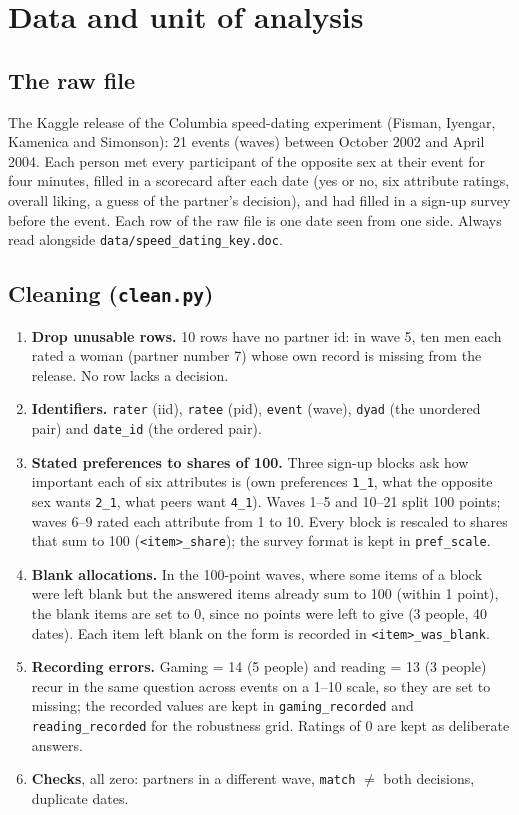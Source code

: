 \documentclass[11pt]{article}
\begin{document}
\section{Data and unit of analysis}

\subsection{The raw file}

The Kaggle release of the Columbia speed-dating experiment (Fisman, Iyengar, Kamenica and Simonson): 21 events (waves) between October 2002 and April 2004. Each person met every participant of the opposite sex at their event for four minutes, filled in a scorecard after each date (yes or no, six attribute ratings, overall liking, a guess of the partner's decision), and had filled in a sign-up survey before the event. Each row of the raw file is one date seen from one side. Always read alongside \texttt{data/speed\_dating\_key.doc}.

\subsection{Cleaning (\texttt{clean.py})}

\begin{enumerate}
\item \textbf{Drop unusable rows.} 10 rows have no partner id: in wave 5, ten men each rated a woman (partner
number 7) whose own record is missing from the release. No row lacks a decision.
\item \textbf{Identifiers.} \texttt{rater} (iid), \texttt{ratee} (pid), \texttt{event} (wave), \texttt{dyad} (the
unordered pair) and \texttt{date\_id} (the ordered pair).
\item \textbf{Stated preferences to shares of 100.} Three sign-up blocks ask how important each of six attributes is
(own preferences \texttt{1\_1}, what the opposite sex wants \texttt{2\_1}, what peers want \texttt{4\_1}). Waves
1--5 and 10--21 split 100 points; waves 6--9 rated each attribute from 1 to 10. Every block is rescaled to shares that
sum to 100 (\texttt{<item>\_share}); the survey format is kept in \texttt{pref\_scale}.
\item \textbf{Blank allocations.} In the 100-point waves, where some items of a block were left blank but the
answered items already sum to 100 (within 1 point), the blank items are set to 0, since no points were left to give
(3 people, 40 dates). Each item left blank on the form is recorded in \texttt{<item>\_was\_blank}.
\item \textbf{Recording errors.} Gaming = 14 (5 people) and reading = 13 (3 people) recur in the same question across
events on a 1--10 scale, so they are set to missing; the recorded values are kept in \texttt{gaming\_recorded} and
\texttt{reading\_recorded} for the robustness grid. Ratings of 0 are kept as deliberate answers.
\item \textbf{Checks}, all zero: partners in a different wave, \texttt{match} $\ne$ both decisions, duplicate dates.
\end{enumerate}
\end{document}
